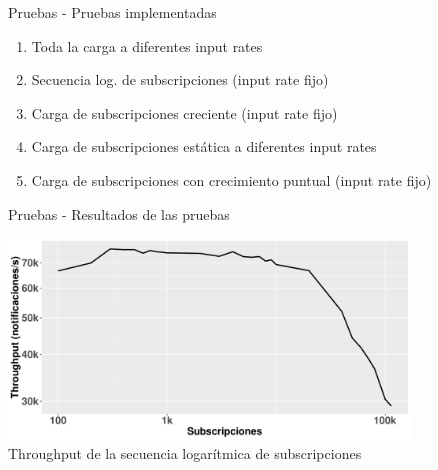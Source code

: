 \documentclass[12pt, spanish]{beamer}
\begin{document}
\begin{frame}{Pruebas - Pruebas implementadas} %
    
    \begin{enumerate}
        \item Toda la carga a diferentes input rates\vspace{0.25cm}
        \item Secuencia log. de subscripciones (input rate fijo)\vspace{0.25cm}
        \item Carga de subscripciones creciente (input rate fijo)\vspace{0.25cm}
        \item Carga de subscripciones estática a diferentes input rates\vspace{0.25cm}
        \item Carga de subscripciones con crecimiento puntual (input rate fijo)
    \end{enumerate}
    
    
\end{frame}

\begin{frame}{Pruebas - Resultados de las pruebas} %
    \begin{center}
        \includegraphics[width=0.8\textwidth]{images/throughput_logsubs_IR-100k.pdf}\\
        {\small Throughput de la secuencia logarítmica de subscripciones}
    \end{center}
\end{frame}
\end{document}
